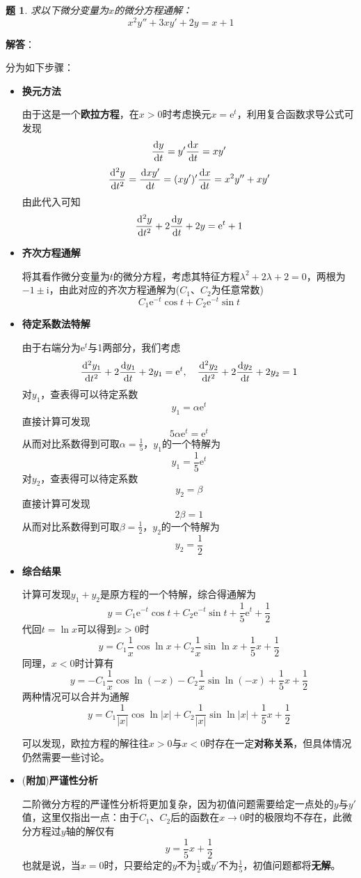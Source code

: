 \documentclass[a4paper,UTF8,fontset=windows,AutoFakeBold]{ctexart}
\newcommand*{\dr}{\hspace{0.07em}\mathrm{d}}
\newcommand*{\er}{\mathrm{e}}
\newcommand*{\ir}{\mathrm{i}}
\newcommand*{\extra}{\textbf{附加}}
\newcommand*{\note}{\noindent *}
\theoremstyle{ex}
\newtheorem{exercise}{题}
\newcommand{\sol}[1]{{\vspace{5pt}\kaishu\noindent\textbf{解答}：\vspace{-3pt}
\begin{compactitem}
    \item[] #1
\end{compactitem}
}}
\begin{document}
\begin{framed}
\begin{exercise}
    求以下微分变量为$x$的微分方程通解：
    $$x^2y''+3xy'+2y=x+1$$
\end{exercise}
\sol{
    分为如下步骤：
    \begin{itemize}
        \item \textbf{换元方法}
        
        由于这是一个\textbf{欧拉方程}，在$x>0$时考虑换元$x=\er^t$，利用复合函数求导公式可发现
        $$\frac{\dr y}{\dr t}=y'\frac{\dr x}{\dr t}=xy'$$
        $$\frac{\dr^2y}{\dr t^2}=\frac{\dr xy'}{\dr t}=(xy')'\frac{\dr x}{\dr t}=x^2y''+xy'$$
        由此代入可知
        $$\frac{\dr^2y}{\dr t^2}+2\frac{\dr y}{\dr t}+2y=\er^t+1$$

        \item \textbf{齐次方程通解}
        
        将其看作微分变量为$t$的微分方程，考虑其特征方程$\lambda^2+2\lambda+2=0$，两根为$-1\pm\ir$，由此对应的齐次方程通解为($C_1$、$C_2$为任意常数)
        $$C_1\er^{-t}\cos t+C_2\er^{-t}\sin t$$

        \item \textbf{待定系数法特解}
        
        由于右端分为$\er^t$与1两部分，我们考虑
        $$\frac{\dr^2y_1}{\dr t^2}+2\frac{\dr y_1}{\dr t}+2y_1=\er^t,\quad \frac{\dr^2y_2}{\dr t^2}+2\frac{\dr y_2}{\dr t}+2y_2=1$$
        对$y_1$，查表得可以待定系数
        $$y_1=\alpha\er^t$$
        直接计算可发现
        $$5\alpha\er^t=\er^t$$
        从而对比系数得到可取$\alpha=\frac{1}{5}$，$y_1$的一个特解为
        $$y_1=\frac{1}{5}\er^t$$
        对$y_2$，查表得可以待定系数
        $$y_2=\beta$$
        直接计算可发现
        $$2\beta=1$$
        从而对比系数得到可取$\beta=\frac{1}{2}$，$y_2$的一个特解为
        $$y_2=\frac{1}{2}$$

        \item \textbf{综合结果}
        
        计算可发现$y_1+y_2$是原方程的一个特解，综合得通解为
        $$y=C_1\er^{-t}\cos t+C_2\er^{-t}\sin t+\frac{1}{5}\er^t+\frac{1}{2}$$
        代回$t=\ln x$可以得到$x>0$时
        $$y=C_1\frac{1}{x}\cos\ln x+C_2\frac{1}{x}\sin\ln x+\frac{1}{5}x+\frac{1}{2}$$
        同理，$x<0$时计算有
        $$y=-C_1\frac{1}{x}\cos\ln(-x)-C_2\frac{1}{x}\sin\ln(-x)+\frac{1}{5}x+\frac{1}{2}$$
        两种情况可以合并为通解
        $$y=C_1\frac{1}{|x|}\cos\ln|x|+C_2\frac{1}{|x|}\sin\ln|x|+\frac{1}{5}x+\frac{1}{2}$$

        \note 可以发现，欧拉方程的解往往$x>0$与$x<0$时存在一定\textbf{对称关系}，但具体情况仍然需要一些讨论。

        \item (\extra)\textbf{严谨性分析}
        
        二阶微分方程的严谨性分析将更加复杂，因为初值问题需要给定一点处的$y$与$y'$值，这里仅指出一点：由于$C_1$、$C_2$后的函数在$x\to0$时的极限均不存在，此微分方程过$y$轴的解仅有
        $$y=\frac{1}{5}x+\frac{1}{2}$$
        也就是说，当$x=0$时，只要给定的$y$不为$\frac{1}{2}$或$y'$不为$\frac{1}{5}$，初值问题都将\textbf{无解}。
    \end{itemize}
}
\end{framed}
\end{document}
